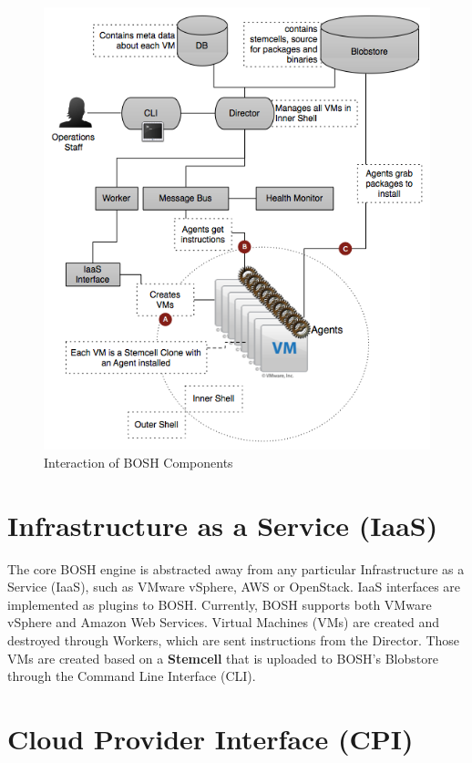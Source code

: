 \begin{figure}[htbp]
\centering
\includegraphics[keepaspectratio,width=\textwidth,height=0.75\textheight]{fig1.png}
\caption{Interaction of BOSH Components}
\label{}
\end{figure}


\section{Infrastructure as a Service (IaaS)}
\label{infrastructureasaserviceiaas}

The core BOSH engine is abstracted away from any particular Infrastructure as a Service (IaaS), such as VMware vSphere, AWS or OpenStack. IaaS interfaces are implemented as plugins to BOSH. Currently, BOSH supports both VMware vSphere and Amazon Web Services. Virtual Machines (VMs) are created and destroyed through Workers, which are sent instructions from the Director. Those VMs are created based on a \textbf{Stemcell} that is uploaded to BOSH's Blobstore through the Command Line Interface (CLI).

\section{Cloud Provider Interface (CPI)}
\label{cloudproviderinterfacecpi}

